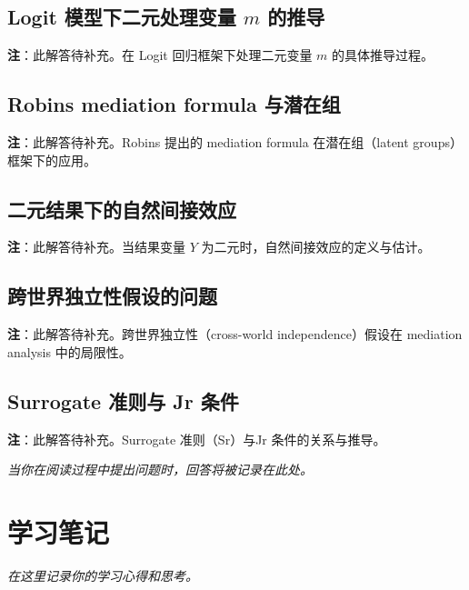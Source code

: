 \subsection*{Logit 模型下二元处理变量 $m$ 的推导}\label{sec:sol-logit-binary-m}

\textbf{注}：此解答待补充。在 Logit 回归框架下处理二元变量 $m$ 的具体推导过程。

\subsection*{Robins  mediation formula 与潜在组}\label{sec:sol-mediation-robins-latent-groups}

\textbf{注}：此解答待补充。Robins 提出的 mediation formula 在潜在组（latent groups）框架下的应用。

\subsection*{二元结果下的自然间接效应}\label{sec:sol-nie-binary}

\textbf{注}：此解答待补充。当结果变量 $Y$ 为二元时，自然间接效应的定义与估计。

\subsection*{跨世界独立性假设的问题}\label{sec:sol-no-crossworld}

\textbf{注}：此解答待补充。跨世界独立性（cross-world independence）假设在 mediation analysis 中的局限性。

\subsection*{Surrogate 准则与 Jr 条件}\label{sec:sol-sr-jr}

\textbf{注}：此解答待补充。Surrogate 准则（Sr）与Jr 条件的关系与推导。

\textit{当你在阅读过程中提出问题时，回答将被记录在此处。}


\section{学习笔记}

\textit{在这里记录你的学习心得和思考。}

\endinput
